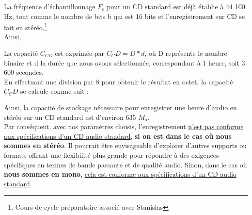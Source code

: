 La fréquence d'échantillonnage $F_e$ pour un CD standard est déjà établie à 44 100 Hz, tout comme le nombre de bits b qui est 16 bits et l'enregistrement sur CD se fait en stéréo.\footnote{Cours de cycle préparatoire associé avec Stanislas}
\\
Ainsi, \\

La capacité $C_{CD}$ est exprimée par $C_CD = D * d$, où D représente le nombre binaire et d la durée que nous avons sélectionnée, correspondant à 1 heure, soit 3 600 secondes.
\\
En effectuant une division par 8 pour obtenir le résultat en octet, la capacité $C_CD$ se calcule comme suit : 

Ainsi, la capacité de stockage nécessaire pour enregistrer une heure d'audio en stéréo sur un CD standard est d'environ 635 $M_o$.
\\

Par conséquent, avec nos paramètres choisis, l'enregistrement \uline{n'est pas conforme aux spécifications d'un CD audio standard}, \textbf{si on est dans le cas où nous sommes en stéréo}. Il pourrait être envisageable d'explorer d'autres supports ou formats offrant une flexibilité plus grande pour répondre à des exigences spécifiques en termes de bande passante et de qualité audio. Sinon, dans le cas où \textbf{nous sommes en mono}, \uline{cela est conforme aux spécifications d'un CD audio standard}.

